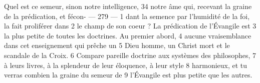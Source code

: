 Quel est ce semeur, sinon notre intelligence,	 
34	 	notre âme qui, recevant la graine de la prédication, et fécon-	 
 	--- 279 ---	 
1	 	dant la semence par l'humidité de la foi, la fait proliférer dans	 
2	 	le champ de son coeur ? La prédication de l'Évangile est	 
3	 	la plus petite de toutes les doctrines. Au premier abord,	 
4	 	aucune vraisemblance dans cet enseignement qui prêche un	 
5	 	Dieu homme, un Christ mort et le scandale de la Croix.	 
6	 	Compare pareille doctrine aux systèmes des philosophes,	 
7	 	à leurs livres, à la splendeur de leur éloquence, à leur style	 
8	 	harmonieux, et tu verras combien la graine du semeur de	 
9	 	l'Évangile est plus petite que les autres.